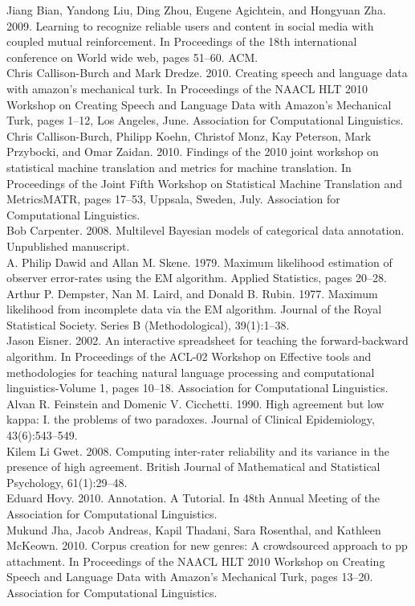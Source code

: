 \documentclass[
]{article}
\begin{document}
Jiang Bian, Yandong Liu, Ding Zhou, Eugene Agichtein, and Hongyuan Zha.
2009. Learning to recognize reliable users and content in social media
with coupled mutual reinforcement. In Proceedings of the 18th
international conference on World wide web, pages 51--60. ACM.\\
Chris Callison-Burch and Mark Dredze. 2010. Creating speech and language
data with amazon's mechanical turk. In Proceedings of the NAACL HLT 2010
Workshop on Creating Speech and Language Data with Amazon's Mechanical
Turk, pages 1--12, Los Angeles, June. Association for Computational
Linguistics.\\
Chris Callison-Burch, Philipp Koehn, Christof Monz, Kay Peterson, Mark
Przybocki, and Omar Zaidan. 2010. Findings of the 2010 joint workshop on
statistical machine translation and metrics for machine translation. In
Proceedings of the Joint Fifth Workshop on Statistical Machine
Translation and MetricsMATR, pages 17--53, Uppsala, Sweden, July.
Association for Computational Linguistics.\\
Bob Carpenter. 2008. Multilevel Bayesian models of categorical data
annotation. Unpublished manuscript.\\
A. Philip Dawid and Allan M. Skene. 1979. Maximum likelihood estimation
of observer error-rates using the EM algorithm. Applied Statistics,
pages 20--28.\\
Arthur P. Dempster, Nan M. Laird, and Donald B. Rubin. 1977. Maximum
likelihood from incomplete data via the EM algorithm. Journal of the
Royal Statistical Society. Series B (Methodological), 39(1):1--38.\\
Jason Eisner. 2002. An interactive spreadsheet for teaching the
forward-backward algorithm. In Proceedings of the ACL-02 Workshop on
Effective tools and methodologies for teaching natural language
processing and computational linguistics-Volume 1, pages 10--18.
Association for Computational Linguistics.\\
Alvan R. Feinstein and Domenic V. Cicchetti. 1990. High agreement but
low kappa: I. the problems of two paradoxes. Journal of Clinical
Epidemiology, 43(6):543--549.\\
Kilem Li Gwet. 2008. Computing inter-rater reliability and its variance
in the presence of high agreement. British Journal of Mathematical and
Statistical Psychology, 61(1):29--48.\\
Eduard Hovy. 2010. Annotation. A Tutorial. In 48th Annual Meeting of the
Association for Computational Linguistics.\\
Mukund Jha, Jacob Andreas, Kapil Thadani, Sara Rosenthal, and Kathleen
McKeown. 2010. Corpus creation for new genres: A crowdsourced approach
to pp attachment. In Proceedings of the NAACL HLT 2010 Workshop on
Creating Speech and Language Data with Amazon's Mechanical Turk, pages
13--20. Association for Computational Linguistics.
\end{document}
